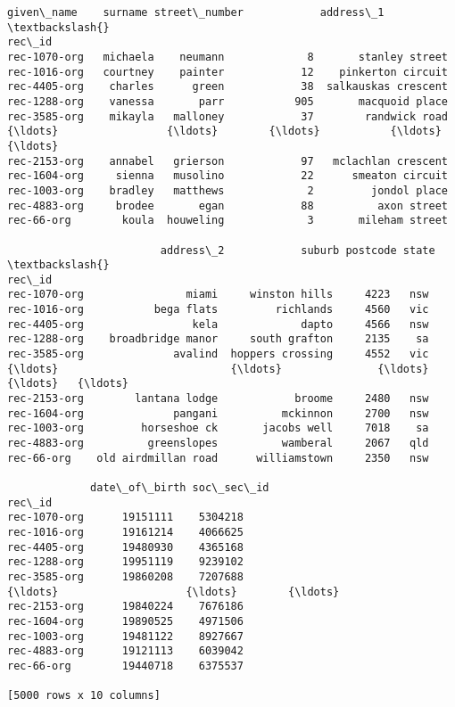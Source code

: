 \documentclass{article}
\begin{document}
    \begin{Verbatim}[commandchars=\\\{\}]

\end{Verbatim}
\begin{Verbatim}[commandchars=\\\{\}]
             given\_name    surname street\_number            address\_1  \textbackslash{}
rec\_id                                                                  
rec-1070-org   michaela    neumann             8       stanley street   
rec-1016-org   courtney    painter            12    pinkerton circuit   
rec-4405-org    charles      green            38  salkauskas crescent   
rec-1288-org    vanessa       parr           905       macquoid place   
rec-3585-org    mikayla   malloney            37        randwick road   
{\ldots}                 {\ldots}        {\ldots}           {\ldots}                  {\ldots}   
rec-2153-org    annabel   grierson            97   mclachlan crescent   
rec-1604-org     sienna   musolino            22      smeaton circuit   
rec-1003-org    bradley   matthews             2         jondol place   
rec-4883-org     brodee       egan            88          axon street   
rec-66-org        koula  houweling             3       mileham street   

                        address\_2            suburb postcode state  \textbackslash{}
rec\_id                                                               
rec-1070-org                miami     winston hills     4223   nsw   
rec-1016-org           bega flats         richlands     4560   vic   
rec-4405-org                 kela             dapto     4566   nsw   
rec-1288-org    broadbridge manor     south grafton     2135    sa   
rec-3585-org              avalind  hoppers crossing     4552   vic   
{\ldots}                           {\ldots}               {\ldots}      {\ldots}   {\ldots}   
rec-2153-org        lantana lodge            broome     2480   nsw   
rec-1604-org              pangani          mckinnon     2700   nsw   
rec-1003-org         horseshoe ck       jacobs well     7018    sa   
rec-4883-org          greenslopes          wamberal     2067   qld   
rec-66-org    old airdmillan road      williamstown     2350   nsw   

             date\_of\_birth soc\_sec\_id  
rec\_id                                 
rec-1070-org      19151111    5304218  
rec-1016-org      19161214    4066625  
rec-4405-org      19480930    4365168  
rec-1288-org      19951119    9239102  
rec-3585-org      19860208    7207688  
{\ldots}                    {\ldots}        {\ldots}  
rec-2153-org      19840224    7676186  
rec-1604-org      19890525    4971506  
rec-1003-org      19481122    8927667  
rec-4883-org      19121113    6039042  
rec-66-org        19440718    6375537  

[5000 rows x 10 columns]
\end{Verbatim}
\end{document}
